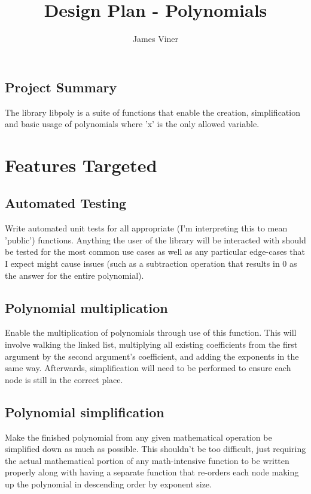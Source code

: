 \documentclass[11pt]{report}
\begin{document}
\title{Design Plan - Polynomials}
\author{James Viner}
\date{} %
\maketitle

\doublespacing

\vspace*{\fill}
\begin{center}
\section*{\textbf{Project Summary}}
The library libpoly is a suite of functions that enable the creation, simplification and basic usage of polynomials where 'x' is the only allowed variable.
\end{center}
\vfill
\pagebreak
\section*{Features Targeted}
\subsection*{Automated Testing}
Write automated unit tests for all appropriate (I'm interpreting this to mean 'public') functions. Anything the user of the library will be interacted with should be tested for the most common use cases as well as any particular edge-cases that I expect might cause issues (such as a subtraction operation that results in 0 as the answer for the entire polynomial).
\subsection*{Polynomial multiplication}
Enable the multiplication of polynomials through use of this function. This will involve walking the linked list, multiplying all existing coefficients from the first argument by the second argument's coefficient, and adding the exponents in the same way. Afterwards, simplification will need to be performed to ensure each node is still in the correct place.
\subsection*{Polynomial simplification}
Make the finished polynomial from any given mathematical operation be simplified down as much as possible. This shouldn't be too difficult, just requiring the actual mathematical portion of any math-intensive function to be written properly along with having a separate function that re-orders each node making up the polynomial in descending order by exponent size.
\pagebreak
\end{document}
